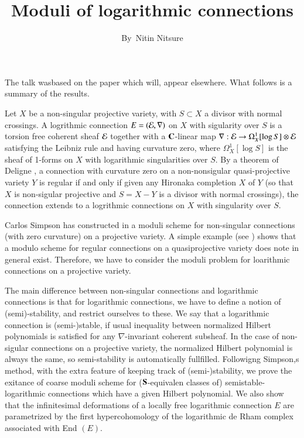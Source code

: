 \title{Moduli of logarithmic connections}

\author{By~Nitin Nitsure}


\date{}
\maketitle

The talk was\pageoriginale based on the paper \cite{art14-keyN} which will, appear elsewhere. What follows is a summary of the results.

Let $X$ be a non-singular projective variety, with $S\subset X$ a divisor with normal crossings. A logrithmic connection $E=(\mathcal{E}, \nabla)$ on $X$ with sigularity over $S$ is a torsion free coherent sheaf  $\mathcal{E}$ together with a $\mathbf{C}$-linear map $\nabla : \mathcal{E} \rightarrow \Omega_{X}^{1}[\log S] \otimes \mathcal{E}$ satisfying the Leibniz rule and having curvature zero, where $\Omega_{X}^{1}[\log S]$ is the sheaf of 1-forms on $X$ with logarithmic singularities over $S$. By a theorem of Deligne \cite{art14-keyD}, a connection with curvature zero on a non-nonsigular quasi-projective variety $Y$ is regular if and only if given any Hironaka completion $X$ of $Y$ (so that $X$ is non-sigular projective and $S=X-Y$ is a divisor with normal crossings), the connection extends to a logrithmic connections on $X$ with singularity over $S$.

Carlos Simpson has constructed in \cite{art14-keyS} a moduli scheme for non-singular connections (with zero curvature) on a projective variety. A simple example (see \cite{art14-keyN}) shows that a modulo scheme for regular connections on a quasiprojective variety does note in general exist. Therefore, we have to consider the moduli problem for loarithmic connections on a projective variety.

The main difference between non-singular connections and logarithmic  connections is that for logarithmic connections,  we have to define a notion of (semi)-stability, and restrict ourselves to these. We say that  a logarithmic connection is (semi-)stable, if usual inequality between normalized Hilbert polynomials is satisfied for any $\nabla$-invariant coherent subsheaf. In the case of non-sigular connections on a projective variety, the normalized Hilbert polynomial is always the same, so semi-stability is automatically fullfilled. Followigng Simpson,s method, with the extra feature of keeping track of (semi-)stability, we prove the exitance of coarse moduli scheme for ($\mathbf{S}$-equivalen classes of) semistable-logarithmic connections which have a given Hilbert polynomial. We also show that the infinitesimal deformations of a locally free logarithmic connection $E$ are parametrized by the first hypercohomology of the logarithmic de Rham complex associated with End $(E)$.

